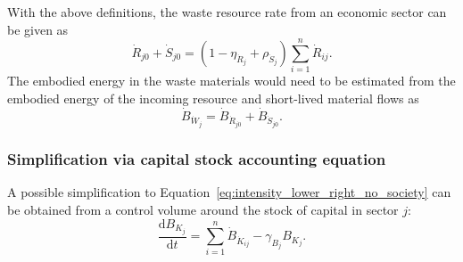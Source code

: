 With the above definitions, the waste resource rate from an economic sector
can be given as
%
\begin{equation}
	\dot{R}_{j0} + \dot{S}_{j0}
	= (1 - \eta_{\dot{R}_{j}} + \rho_{\dot{S}_{j}}) \sum\limits_{i=1}^{n} \dot{R}_{ij}.
\end{equation}
%
The embodied energy in the waste materials would need to be estimated
from the embodied energy of the incoming resource and short-lived material flows as
%
\begin{equation}
	\dot{B}_{\dot{W}_{j}}
	= \dot{B}_{\dot{R}_{j0}} + \dot{B}_{\dot{S}_{j0}}.
\end{equation}


\subsubsection{Simplification via capital stock accounting equation}
\label{sec:capital_accounting}

A possible simplification to Equation~\ref{eq:intensity_lower_right_no_society}
can be obtained from a control volume around the stock of capital in sector $j$:
%
\begin{equation}
	\frac{\mathrm{d}B_{K_{j}}}{\mathrm{d}t}
	= \sum\limits_{i=1}^{n} \dot{B}_{\dot{K}_{ij}} 
	- \gamma_{B_{j}} B_{K_{j}}.
\end{equation}

